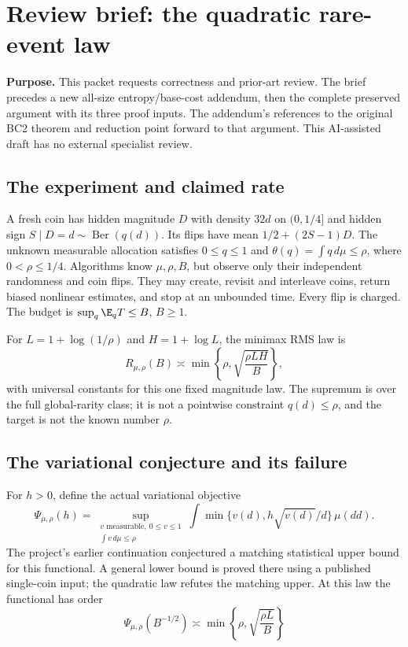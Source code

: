 \section*{Review brief: the quadratic rare-event law}

\noindent\textbf{Purpose.} This packet requests correctness and prior-art review.
The brief precedes a new all-size entropy/base-cost addendum, then the complete
preserved argument with its three proof inputs. The addendum's references to
the original BC2 theorem and reduction point forward to that argument.
This AI-assisted draft has no external specialist review.

\subsection*{The experiment and claimed rate}
A fresh coin has hidden magnitude $D$ with density $32d$ on $(0,1/4]$ and
hidden sign $S\mid D=d\sim\operatorname{Ber}(q(d))$. Its flips have mean
$1/2+(2S-1)D$. The unknown measurable allocation satisfies
$0\le q\le1$ and $\theta(q)=\int q\,d\mu\le\rho$, where $0<\rho\le1/4$.
Algorithms know $\mu,\rho,B$, but observe only their independent randomness
and coin flips. They may create, revisit and interleave coins, return biased
nonlinear estimates, and stop at an unbounded time. Every flip is charged.
The budget is $\sup_q\E_qT\le B$, $B\ge1$.

For $L=1+\log(1/\rho)$ and $H=1+\log L$, the minimax RMS law is
\[
 R_{\mu,\rho}(B)\asymp
 \min\left\{\rho,\sqrt{\frac{\rho LH}{B}}\right\},
\]
with universal constants for this one fixed magnitude law. The supremum is
over the full global-rarity class; it is not a pointwise constraint
$q(d)\le\rho$, and the target is not the known number $\rho$.

\subsection*{The variational conjecture and its failure}
For $h>0$, define the actual variational objective
\[
 \Psi_{\mu,\rho}(h)=
 \sup_{\substack{v\text{ measurable},\ 0\le v\le1\\\int v\,d\mu\le\rho}}
 \int\min\{v(d),h\sqrt{v(d)}/d\}\,\mu(dd).
\]
The project's earlier continuation conjectured a matching statistical upper
bound for this functional. A general lower bound is proved there using a
published single-coin input; the quadratic law refutes the matching upper.
At this law the functional has order
\[
 \Psi_{\mu,\rho}(B^{-1/2})\asymp
 \min\left\{\rho,\sqrt{\frac{\rho L}{B}}\right\}
\]
\clearpage
